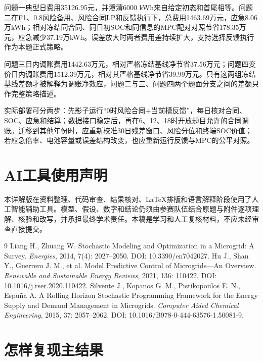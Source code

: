 \documentclass[UTF8,fontset=fandol,a4paper,11pt]{ctexart}
\begin{document}
问题一典型日费用35126.95元，并澄清6000 kWh来自给定初态和首尾相等。问题二在F1、0.8风险备用、风险合同LP和反馈执行下，总费用1463.69万元，应急8.06万kWh；相对冻结同合同、同日初SOC和同信息的MPC配对对照节省178.35万元，应急减少37.19万kWh。误差放大时两者费用差持续扩大，支持选择反馈执行作为本题正式策略。

问题三日内调账费用1442.63万元，相对严格冻结基线净节省37.56万元；问题四变价日内调账费用1512.39万元，相对其严格基线净节省39.99万元。只有这两组冻结基线差额才被解释为调账净效应，问题二与三、问题四两个题面分支之间的差额只作完整策略描述。

实际部署可分两步：先影子运行“0时风险合同+当前槽反馈”，每日核对合同、SOC、应急和结算；数据接口稳定后，再在6、12、18时开放题目允许的合同调账。迁移到其他年份时，应重新校准30日残差窗口、风险分位和终端SOC价值；若应急倍率、电池容量或误差结构改变，也应重新运行反馈与MPC的公平对照。

\section*{AI工具使用声明}

本详解版在资料整理、代码审查、结果核对、LaTeX排版和语言解释阶段使用了人工智能辅助工具。模型、假设、数字和结论仍须由参赛队伍结合原题与附件逐项理解、核验和改写，并承担最终学术责任。本稿是学习和人工复核材料，不应未经审查直接提交。

\begingroup
\raggedright
\begin{thebibliography}{9}
 Liang H., Zhuang W. Stochastic Modeling and Optimization in a Microgrid: A Survey. \emph{Energies}, 2014, 7(4): 2027--2050. DOI: 10.3390/en7042027.
 Hu J., Shan Y., Guerrero J. M., et al. Model Predictive Control of Microgrids---An Overview. \emph{Renewable and Sustainable Energy Reviews}, 2021, 136: 110422. DOI: 10.1016/j.rser.2020.110422.
 Silvente J., Kopanos G. M., Pistikopoulos E. N., Espu\~na A. A Rolling Horizon Stochastic Programming Framework for the Energy Supply and Demand Management in Microgrids. \emph{Computer Aided Chemical Engineering}, 2015, 37: 2057--2062. DOI: 10.1016/B978-0-444-63576-1.50081-9.
\end{thebibliography}
\endgroup

\newpage
\appendix
\section{怎样复现主结果}
\end{document}
